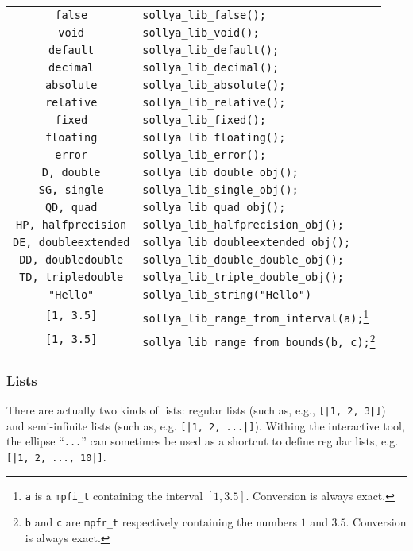 \documentclass[a4paper]{article}
\begin{document}
\begin{table}[htp]
\begin{minipage}{\textwidth}
\begin{center}
\begin{tabular}{|c|l|}
\verb|false| & \verb|sollya_lib_false();| \\
\verb|void| & \verb|sollya_lib_void();| \\
\verb|default| & \verb|sollya_lib_default();| \\
\verb|decimal| & \verb|sollya_lib_decimal();| \\
\verb|absolute| & \verb|sollya_lib_absolute();| \\
\verb|relative| & \verb|sollya_lib_relative();| \\
\verb|fixed| & \verb|sollya_lib_fixed();| \\
\verb|floating| & \verb|sollya_lib_floating();| \\
\verb|error| & \verb|sollya_lib_error();| \\
\verb|D, double| & \verb|sollya_lib_double_obj();| \\
\verb|SG, single| & \verb|sollya_lib_single_obj();| \\
\verb|QD, quad| & \verb|sollya_lib_quad_obj();| \\
\verb|HP, halfprecision| & \verb|sollya_lib_halfprecision_obj();| \\
\verb|DE, doubleextended| & \verb|sollya_lib_doubleextended_obj();| \\
\verb|DD, doubledouble| & \verb|sollya_lib_double_double_obj();| \\
\verb|TD, tripledouble| & \verb|sollya_lib_triple_double_obj();| \\
\verb|"Hello"| &  \verb|sollya_lib_string("Hello")| \\
\verb|[1, 3.5]| &  \verb|sollya_lib_range_from_interval(a);|\footnote{\texttt{a} is a \texttt{mpfi\_t} containing the interval $[1, 3.5]$. Conversion is always exact.} \\
\verb|[1, 3.5]| &  \verb|sollya_lib_range_from_bounds(b, c);|\footnote[2]{\texttt{b} and \texttt{c} are \texttt{mpfr\_t} respectively containing the numbers $1$ and $3.5$.  Conversion is always exact.} \\ \hline
  \end{tabular}
\end{center}
\end{minipage}
\end{table}

\subsubsection{Lists}
\label{creating_lists}
There are actually two kinds of lists: regular lists (such as, e.g., \verb#[|1, 2, 3|]#) and semi-infinite lists (such as, e.g. \verb#[|1, 2, ...|]#). Withing the interactive tool, the ellipse ``\texttt{...}'' can sometimes be used as a shortcut to define regular lists, e.g. \verb#[|1, 2, ..., 10|]#.
\end{document}
